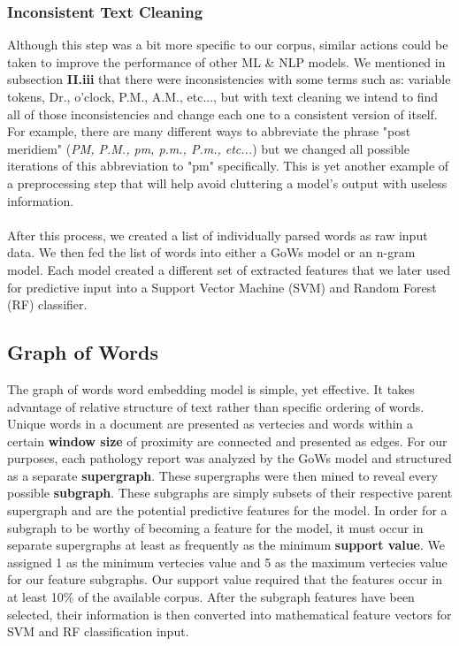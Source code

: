 \documentclass[twoside,twocolumn]{article}
\begin{document}
\subsubsection{Inconsistent Text Cleaning}
Although this step was a bit more specific to our corpus, similar actions could be taken to improve the performance of other ML \& NLP models. We mentioned in subsection \textbf{II.iii} that there were inconsistencies with some terms such as: variable tokens, Dr., o'clock, P.M., A.M., etc..., but with text cleaning we intend to find all of those inconsistencies and change each one to a consistent version of itself. For example, there are many different ways to abbreviate the phrase "post meridiem" (\textit{PM, P.M., pm, p.m., P.m., etc...}) but we changed all possible iterations of this abbreviation to "pm" specifically. This is yet another example of a preprocessing step that will help avoid cluttering a model's output with useless information.\\
\\
After this process, we created a list of individually parsed words as raw input data. We then fed the list of words into either a GoWs model or an n-gram model. Each model created a different set of extracted features that we later used for predictive input into a Support Vector Machine (SVM) and Random Forest (RF) classifier.

\subsection{Graph of Words}
The graph of words word embedding model is simple, yet effective. It takes advantage of relative structure of text rather than specific ordering of words. Unique words in a document are presented as vertecies and words within a certain \textbf{window size} of proximity are connected and presented as edges. For our purposes, each pathology report was analyzed by the GoWs model and structured as a separate \textbf{supergraph}. These supergraphs were then mined to reveal every possible \textbf{subgraph}. These subgraphs are simply subsets of their respective parent supergraph and are the potential predictive features for the model. In order for a subgraph to be worthy of becoming a feature for the model, it must occur in separate supergraphs at least as frequently as the minimum \textbf{support value}. We assigned 1 as the minimum vertecies value and 5 as the maximum vertecies value for our feature subgraphs. Our support value required that the features occur in at least 10\% of the available corpus. After the subgraph features have been selected, their information is then converted into mathematical feature vectors for SVM and RF classification input.
\end{document}
